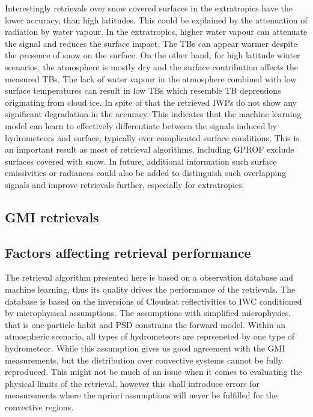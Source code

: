 \documentclass[amt, manuscript]{copernicus}
\begin{document}
Interestingly retrievals over snow covered surfaces in the extratropics have the lower accuracy, than high latitudes. This could be explained by the attenuation of radiation by water vapour. In the extratropics, higher water vapour can attenuate the signal and reduces the surface impact. The TBs can appear warmer despite the presence of snow on the surface.  On the other hand, for high latitude winter scenarios, the atmosphere is mostly dry and the surface contribution affects the measured TBs. The lack of water vapour in the atmosphere combined with low surface temperatures can result in low TBs which resemble TB depressions originating from cloud ice. In spite of that the retrieved IWPs do not show any significant degradation in the accuracy. This indicates that the machine learning model can learn to effectively differentiate between the signals induced by hydrometeors and surface, typically over complicated surface conditions. This is an important result as most of retrieval algorithms, including GPROF exclude surfaces covered with snow. In future, additional information such  surface emissivities or radiances could also be added to distinguish such overlapping signals and improve retrievals further, especially for extratropics.  

\subsection{GMI retrievals}
%

\subsection{Factors affecting retrieval performance}
%
The retrieval algorithm presented here is based on a observation database and machine learning, thus its quality drives the performance of the retrievals. The database is based on the inversions of Cloudsat reflectivities to IWC conditioned by microphysical assumptions. The assumptions with simplified microphysics, that is one particle habit and PSD constrains the forward model. Within an atmospheric scenario, all types of hydrometeors are reprseneted by one type of hydrometeor. While this assumption gives us good agreement with the GMI measurements, but the distribution over convective systems cannot be fully reproduced. This might not be much of an issue when it comes to evaluating the physical limits of the retrieval, however this shall introduce errors for measurements where the apriori assumptions will never be fulfilled for the convective regions.
\end{document}
